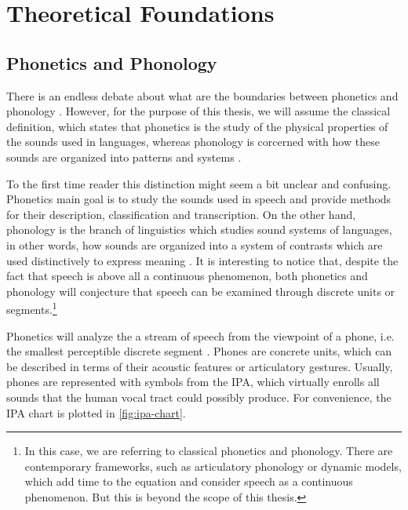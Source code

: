 \chapter{Theoretical Foundations}\label{ch:foundations}

\section{Phonetics and Phonology}\label{sec:phonetics-phonology}

There is an endless debate about what are the boundaries between phonetics and phonology \cite{Steriade2000}. However, for the purpose of this thesis, we will assume the classical definition, which states that phonetics is the study of the physical properties of the sounds used in languages, whereas phonology is corcerned with how these sounds are organized into patterns and systems \cite{Davenport2010}.

To the first time reader this distinction might seem a bit unclear and confusing. Phonetics main goal is to study the sounds used in speech and provide methods for their description, classification and transcription. On the other hand, phonology is the branch of linguistics which studies sound systems of languages, in other words, how sounds are organized into a system of contrasts which are used distinctively to express meaning \cite{Crystal2011}. It is interesting to notice that, despite the fact that speech is above all a continuous phenomenon, both phonetics and phonology will conjecture that speech can be examined through discrete units or segments.\footnote{In this case, we are referring to classical phonetics and phonology. There are contemporary frameworks, such as articulatory phonology or dynamic models, which add time to the equation and consider speech as a continuous phenomenon. But this is beyond the scope of this thesis.}

Phonetics will analyze the a stream of speech from the viewpoint of a phone, i.e. the smallest perceptible discrete segment \cite{Crystal2011}. Phones are concrete units, which can be described in terms of their acoustic features or articulatory gestures. Usually, phones are represented with symbols from the \ac{IPA}, which virtually enrolls all sounds that the human vocal tract could possibly produce. For convenience, the \ac{IPA} chart is plotted in \autoref{fig:ipa-chart}.

